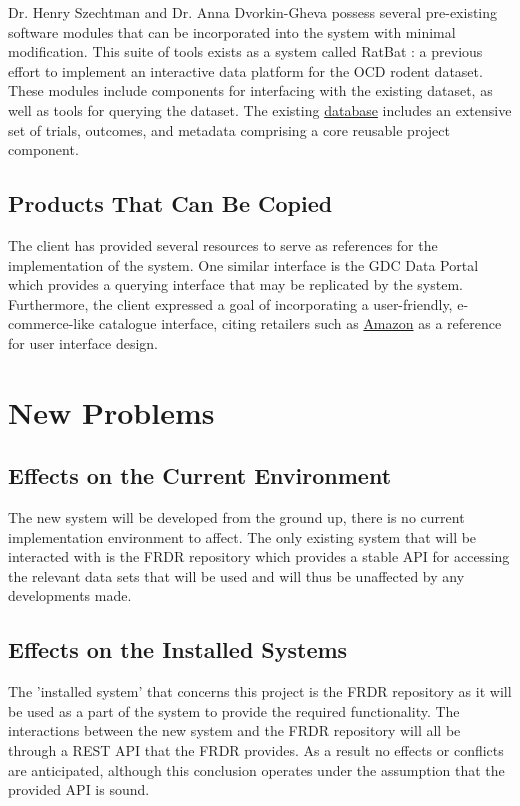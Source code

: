 \documentclass[12pt]{article}
\begin{document}
Dr. Henry Szechtman and Dr. Anna Dvorkin-Gheva possess several pre-existing software modules that can be incorporated into the system with minimal modification. This suite of tools exists as a system called RatBat \cite{GitHub_RatBAT}: a previous effort to implement an interactive data platform for the OCD rodent dataset. These modules include components for interfacing with the existing dataset, as well as tools for querying the dataset. The existing \href{https://doi.org/10.1093/gigascience/giac092}{database} includes an extensive set of trials, outcomes, and metadata comprising a core reusable project component.

\subsection{Products That Can Be Copied}


The client has provided several resources to serve as references for the implementation of the system. One similar interface is the GDC Data Portal \cite{GDCDataPortal2024} which provides a querying interface that may be replicated by the system. Furthermore, the client expressed a goal of incorporating a user-friendly, e-commerce-like catalogue interface, citing retailers such as \href{https://amazon.ca}{Amazon} as a reference for user interface design. 


\section{New Problems}
\subsection{Effects on the Current Environment}

The new system will be developed from the ground up, there is no current implementation environment to affect. The only existing system that will be interacted with is the FRDR repository which provides
a stable API for accessing the relevant data sets that will be used and will thus be unaffected by any developments made.

\subsection{Effects on the Installed Systems}

\par{ The 'installed system' that concerns this project is the FRDR repository as it will be used as a part of the system to provide the required functionality. The interactions between the new system and
the FRDR repository will all be through a REST API that the FRDR provides. As a result no effects or conflicts are anticipated, although this conclusion operates under the assumption that the provided
API is sound. }
\end{document}
